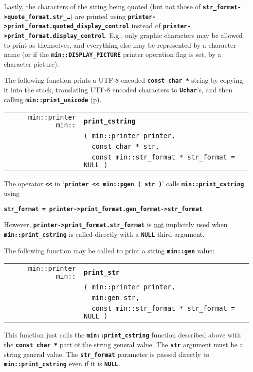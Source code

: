 \documentclass[12pt]{article}
\makeatletter
\newcommand{\TT}[1]{{\tt \bfseries #1}}
\newcommand{\ttindex}[1]{\index{#1@{\tt #1}}}
\newcommand{\pagref}[1]{p\pageref{#1}}
\newcommand{\EOL}{\penalty \exhyphenpenalty}
\newenvironment{indpar}[1][0.3in]%
	{\begin{list}{}%
		     {\setlength{\itemsep}{0in}%
		      \setlength{\topsep}{0in}%
		      \setlength{\parsep}{1ex}%
		      \setlength{\labelwidth}{#1}%
		      \setlength{\leftmargin}{#1}%
		      \addtolength{\leftmargin}{\labelsep}}%
	 \item}%
	{\end{list}}
\newcommand{\LABEL}[1]{\label{#1}}
\newlength{\ARGBREAKLENGTH}
\newcommand{\ARGBREAK}[1][\ARGBREAKLENGTH]{\\&\hspace*{#1}}
\newcommand{\MINKEY}[1]%
	   {\TT{#1}\ttindex{min::#1}\ttindex{#1}}
\makeatother
\begin{document}
Lastly, the characters of the string being quoted (but \underline{not}
those of \TT{str\_\EOL format->\EOL quote\_\EOL format.str\_\ldots})
are printed using
\TT{printer->\EOL print\_format.quoted\_\EOL display\_\EOL control}
instead of \TT{printer->\EOL print\_\EOL format.display\_\EOL control}.
E.g., only graphic characters may be allowed to print as themselves,
and everything else may be represented by a character name
(or if the \TT{min::\EOL DISPLAY\_\EOL PICTURE} printer operation
flag is set, by a character picture).

The following function
prints a UTF-8 encoded \TT{const char *}
string by copying it into the stack, translating UTF-8 encoded
characters to \TT{Uchar}'s, and then calling \TT{min::\EOL print\_\EOL unicode} (\pagref{MIN::PRINT_UNICODE}).

\begin{indpar}[1em]\begin{tabular}{r@{}l}
\verb|min::printer min::| & \MINKEY{print\_cstring}\ARGBREAK
    \verb|( min::printer printer,|\ARGBREAK
    \verb|  const char * str,|\ARGBREAK
    \verb|  const min::str_format * str_format = NULL )|
\LABEL{MIN::PRINT_CSTRING} \\
\end{tabular}\end{indpar}

The operator \TT{<{}<} in `\TT{printer <{}< min::pgen ( str )}' calls
\TT{min::\EOL print\_\EOL cstring} using
\begin{center}
\TT{str\_format = printer->print\_format.gen\_format->str\_format}
\end{center}
However,
\TT{printer->\EOL print\_\EOL format.str\_\EOL format} is \underline{not}
implicitly used when \TT{min::\EOL print\_\EOL cstring} is called directly
with a \TT{NULL} third argument.

The following function may be called to print a string \TT{min::gen} value:

\begin{indpar}[1em]\begin{tabular}{r@{}l}
\verb|min::printer min::| & \MINKEY{print\_str}\ARGBREAK
    \verb|( min::printer printer,|\ARGBREAK
    \verb|  min:gen str,|\ARGBREAK
    \verb|  const min::str_format * str_format = NULL )|
\LABEL{MIN::PRINT_STR} \\
\end{tabular}\end{indpar}

This function just calls the \TT{min::\EOL print\_\EOL cstring} function
described above with the \TT{const char *} part of the string general value.
The \TT{str} argument must be a string general value.
The \TT{str\_\EOL format} parameter is passed directly to
\TT{min::\EOL print\_\EOL cstring} even if it is \TT{NULL}.
\end{document}

